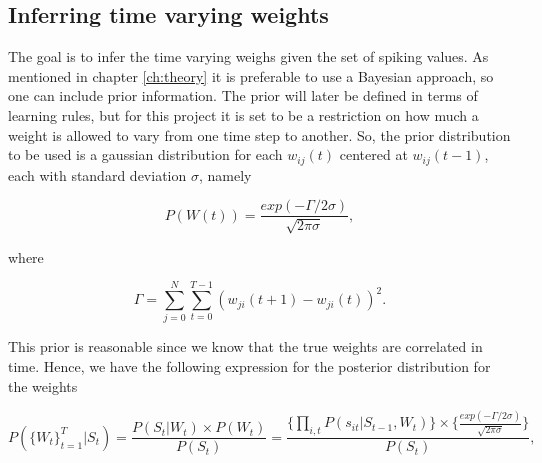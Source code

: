 




\subsection{Inferring time varying weights}
The goal is to infer the time varying weighs given the set of spiking values. As mentioned in chapter \ref{ch:theory} it is preferable to use a Bayesian approach, so one can include prior information. The prior will later be defined in terms of learning rules, but for this project it is set to be a restriction on how much a weight is allowed to vary from one time step to another. So, the prior distribution to be used is a gaussian distribution for each $w_{ij}(t)$ centered at $w_{ij}(t-1)$, each with standard deviation $\sigma$, namely

\begin{equation}
    P(W(t)) = \frac{exp(-\Gamma /2\sigma)}{\sqrt{2\pi \sigma}},
\end{equation}

where

\begin{equation}
    \Gamma = \sum_{j=0}^{N} \sum_{t=0}^{T-1} (w_{ji}(t+1)-w_{ji}(t))^2.
\end{equation}

 This prior is reasonable since we know that the true weights are correlated in time. Hence, we have the following expression for the posterior distribution for the weights

\begin{equation}
\label{Posterior}
        P(\{W_t\}_{t=1}^{T}|S_t) = \frac{P(S_t|W_t)\times P(W_t)}{P(S_t)} = \frac{\Big\{\prod_{i,t} P(s_{it}|S_{t-1}, W_t)\Big\} \times \Big\{\frac{exp(-\Gamma /2\sigma)}{\sqrt{2\pi \sigma}}\Big\}}{P(S_t)}, 
\end{equation}

